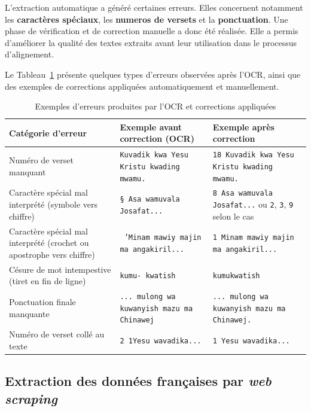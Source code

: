 L'extraction automatique a généré certaines erreurs. Elles concernent notamment les \textbf{caractères spéciaux}, les \textbf{numeros de versets} et la \textbf{ponctuation}. Une phase de vérification et de correction manuelle a donc été réalisée. Elle a permis d'améliorer la qualité des textes extraits avant leur utilisation dans le processus d'alignement.

Le Tableau~\ref{tab:erreurs_ocr} présente quelques types d'erreurs observées après l'\ac{OCR}, ainsi que des exemples de corrections appliquées automatiquement et manuellement.

\begin{table}[H]
\centering
\renewcommand{\arraystretch}{1.5}
\small
\begin{tabularx}{\textwidth}{>{\raggedright\arraybackslash}p{3.4cm}>{\raggedright\arraybackslash}X>{\raggedright\arraybackslash}X}
\toprule
\textbf{Catégorie d'erreur} & \textbf{Exemple avant correction (\ac{OCR})} & \textbf{Exemple après correction} \\
\midrule
Numéro de verset manquant & \texttt{Kuvadik kwa Yesu Kristu kwading mwamu.} & \texttt{18 Kuvadik kwa Yesu Kristu kwading mwamu.} \\
Caractère spécial mal interprété (symbole vers chiffre) & \texttt{\S{} Asa wamuvala Josafat...} & \texttt{8 Asa wamuvala Josafat...} ou \texttt{2}, \texttt{3}, \texttt{9} selon le cas \\
Caractère spécial mal interprété (crochet ou apostrophe vers chiffre) & \texttt{\char93 'Minam mawiy majin ma angakiril...} & \texttt{1 Minam mawiy majin ma angakiril...} \\
Césure de mot intempestive (tiret en fin de ligne) & \texttt{kumu- kwatish} & \texttt{kumukwatish} \\
Ponctuation finale manquante & \texttt{... mulong wa kuwanyish mazu ma Chinawej} & \texttt{... mulong wa kuwanyish mazu ma Chinawej.} \\
Numéro de verset collé au texte & \texttt{2 1Yesu wavadika...} & \texttt{1 Yesu wavadika...} \\
\bottomrule
\end{tabularx}
\caption{Exemples d'erreurs produites par l'OCR et corrections appliquées}
\label{tab:erreurs_ocr}
\end{table}

\subsection{Extraction des données françaises par \textit{web scraping}}

